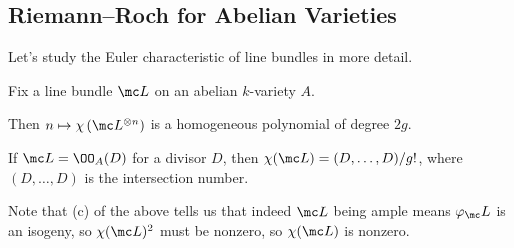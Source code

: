 \documentclass[../notes.tex]{subfiles}
\begin{document}
\subsection{Riemann--Roch for Abelian Varieties}
Let's study the Euler characteristic of line bundles in more detail.
\begin{proposition} \label{prop:riemann-roch-av}
	Fix a line bundle $\mc L$ on an abelian $k$-variety $A$.
	\begin{listalph}
		\item Then $n\mapsto\chi\left(\mc L^{\otimes n}\right)$ is a homogeneous polynomial of degree $2g$.
		\item If $\mc L=\OO_A(D)$ for a divisor $D$, then $\chi(\mc L)=(D,\ldots,D)/g!$, where $(D,\ldots,D)$ is the intersection number.
	\end{listalph}
\end{proposition}
\begin{remark} \label{rem:euler-char-of-ample-nonzero}
	Note that (c) of the above tells us that indeed $\mc L$ being ample means $\varphi_\mc L$ is an isogeny, so $\chi(\mc L)^2$ must be nonzero, so $\chi(\mc L)$ is nonzero.
\end{remark}
\end{document}

